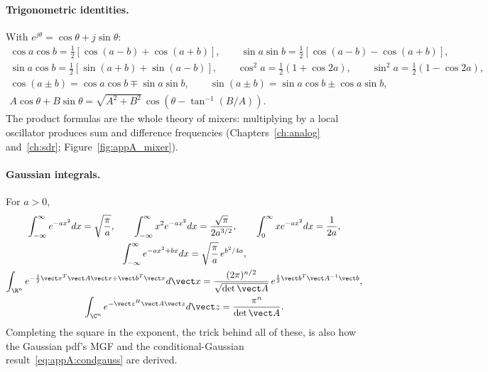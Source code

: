 \paragraph{Trigonometric identities.} With $e^{j\theta}=\cos\theta+j\sin\theta$:
\begin{gather}
\cos a\cos b=\tfrac12[\cos(a-b)+\cos(a+b)],\qquad \sin a\sin b=\tfrac12[\cos(a-b)-\cos(a+b)],\\
\sin a\cos b=\tfrac12[\sin(a+b)+\sin(a-b)],\qquad \cos^2a=\tfrac12(1+\cos2a),\qquad \sin^2a=\tfrac12(1-\cos2a),\\
\cos(a\pm b)=\cos a\cos b\mp\sin a\sin b,\qquad \sin(a\pm b)=\sin a\cos b\pm\cos a\sin b,\\
A\cos\theta+B\sin\theta=\sqrt{A^2+B^2}\,\cos(\theta-\tan^{-1}(B/A)).
\end{gather}
The product formulas are the whole theory of mixers: multiplying by a local oscillator produces
sum and difference frequencies (Chapters~\ref{ch:analog} and~\ref{ch:sdr};
Figure~\ref{fig:appA_mixer}).


\paragraph{Gaussian integrals.} For $a>0$,
\begin{gather}
\int_{-\infty}^{\infty}e^{-ax^2}dx=\sqrt{\frac\pi a},\qquad
\int_{-\infty}^{\infty}x^2e^{-ax^2}dx=\frac{\sqrt\pi}{2a^{3/2}},\qquad
\int_0^\infty xe^{-ax^2}dx=\frac1{2a},\\
\int_{-\infty}^{\infty}e^{-ax^2+bx}dx=\sqrt{\frac\pi a}\,e^{b^2/4a},\\
\int_{\R^n}e^{-\frac12\vect x^T\vect A\vect x+\vect b^T\vect x}d\vect x=\frac{(2\pi)^{n/2}}{\sqrt{\det\vect A}}\,e^{\frac12\vect b^T\vect A^{-1}\vect b},\\
\int_{\C^n}e^{-\vect z^H\vect A\vect z}d\vect z=\frac{\pi^n}{\det\vect A}.
\end{gather}
Completing the square in the exponent, the trick behind all of these, is also how the Gaussian
pdf's MGF and the conditional-Gaussian result~\eqref{eq:appA:condgauss} are derived.

